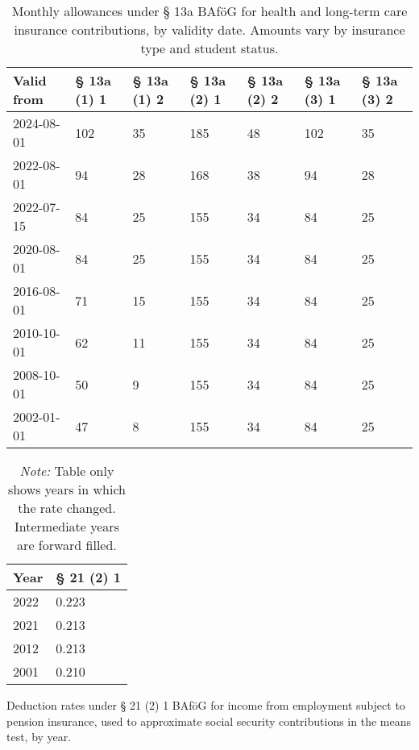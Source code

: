 \vspace{1em}

\begin{table}[H]
\centering
\small
\begin{tabularx}{\textwidth}{lXXXXXX}
\toprule
\textbf{Valid from} & \textbf{§ 13a (1) 1} & \textbf{§ 13a (1) 2} & \textbf{§ 13a (2) 1} & \textbf{§ 13a (2) 2} & \textbf{§ 13a (3) 1} & \textbf{§ 13a (3) 2} \\
\midrule
2024-08-01 & 102 & 35 & 185 & 48 & 102 & 35 \\
2022-08-01 & 94  & 28 & 168 & 38 & 94  & 28 \\
2022-07-15 & 84  & 25 & 155 & 34 & 84  & 25 \\
2020-08-01 & 84  & 25 & 155 & 34 & 84  & 25 \\
2016-08-01 & 71  & 15 & 155 & 34 & 84  & 25 \\
2010-10-01 & 62  & 11 & 155 & 34 & 84  & 25 \\
2008-10-01 & 50  & 9  & 155 & 34 & 84  & 25 \\
2002-01-01 & 47  & 8  & 155 & 34 & 84  & 25 \\
\bottomrule
\end{tabularx}
\caption{Monthly allowances under § 13a BAföG for health and long-term care insurance contributions, by validity date. Amounts vary by insurance type and student status.}
\label{tab:bafog_values_13a}
\end{table}

\vspace{1em}

\begin{table}[H]
\centering
\small
\begin{tabularx}{\textwidth}{lX}
\toprule
\textbf{Year} & \textbf{§ 21 (2) 1} \\
\midrule
2022 & 0.223 \\
2021 & 0.213 \\
2012 & 0.213 \\
2001 & 0.210 \\
\bottomrule
\end{tabularx}
\caption{Deduction rates under § 21 (2) 1 BAföG for income from employment subject to pension insurance, used to approximate social security contributions in the means test, by year.}
\caption*{\textit{Note:} Table only shows years in which the rate changed. Intermediate years are forward filled.}
\label{tab:bafog_rates}
\end{table}

\vspace{1em}

